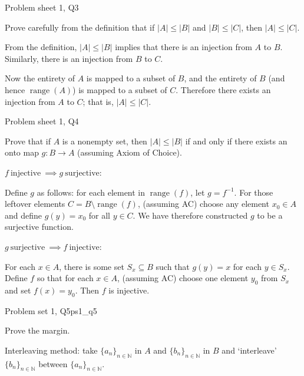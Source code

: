\begin{problem}{Problem sheet 1, Q3}{}


    Prove carefully from the definition that if $\lvert A \rvert \leq \lvert B \rvert$ and $\lvert B \rvert \leq \lvert C \rvert$, then $\lvert A \rvert \leq \lvert C \rvert$.

    \tcblower

    From the definition, $\lvert A \rvert \leq \lvert B \rvert$ implies that there is an injection from $A$ to $B$. Similarly, there is an injection from $B$ to $C$.

    Now the entirety of $A$ is mapped to a subset of $B$, and the entirety of $B$ (and hence $\operatorname{range}(A)$) is mapped to a subset of $C$. Therefore there exists an injection from $A$ to $C$; that is, $\lvert A \rvert \leq \lvert C \rvert$.
    
\end{problem}

\begin{problem}{Problem sheet 1, Q4}{}


    Prove that if $A$ is a nonempty set, then $\lvert A \rvert \leq \lvert B \rvert$ if and only if there exists an onto map $g : B \to A$ (assuming Axiom of Choice).

    \tcblower

    \underline{$f \ \text{injective} \ \implies g \ \text{surjective}$}:
    
    Define $g$ as follows: for each element in $\operatorname{range}(f)$, let $g = f^{-1}$. For those leftover elements $C = B \setminus \operatorname{range}(f)$, (assuming AC) choose any element $x_0 \in A$ and define $g(y) = x_0$ for all $y \in C$. We have therefore constructed $g$ to be a surjective function.

    \underline{$g \ \text{surjective} \ \implies f \ \text{injective}$}:

    For each $x \in A$, there is some set $S_x \subseteq B$ such that $g(y) = x$ for each $y \in S_x$. Define $f$ so that for each $x \in A$, (assuming AC) choose one element $y_0$ from $S_x$ and set $f(x) = y_0$. Then $f$ is injective.
    
\end{problem}

\begin{problem}{Problem set 1, Q5}{ps1_q5}

    
    Prove the margin.

    \tcblower

    Interleaving method: take $\{a_n\}_{n \in \mathbb{N}}$ in $A$ and $\{b_n\}_{n \in \mathbb{N}}$ in $B$ and `interleave' $\{b_n\}_{n \in \mathbb{N}}$ between $\{a_n\}_{n \in \mathbb{N}}$.

\end{problem}

